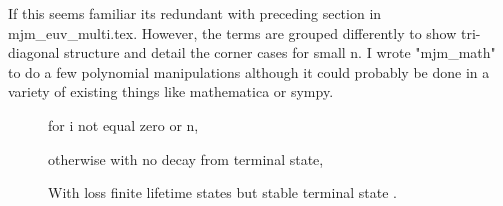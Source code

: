 
If this seems familiar its redundant with 
preceding section in mjm\_euv\_multi.tex.
However, the terms are grouped differently to show tri-diagonal
structure and detail the corner cases for small n.
I wrote "mjm\_math" to do a few polynomial manipulations
although it could probably be done in a variety of existing
things like mathematica or sympy. 

\begin{figure}[htb]
\centering



for i not equal zero or n,



otherwise with no decay from terminal state,



\caption{ With loss finite lifetime states but stable terminal state . }
\label{fig:leakynrepeat}
\end{figure}



